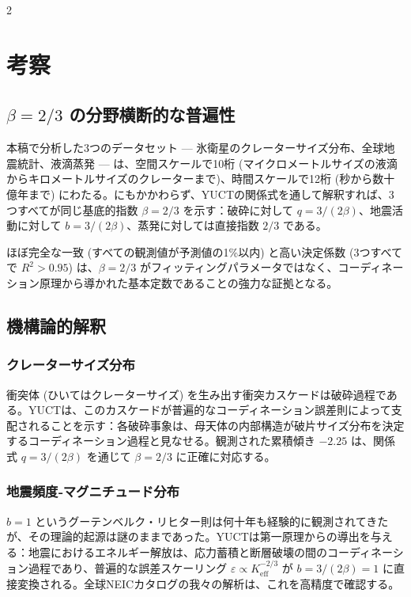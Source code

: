 \documentclass[11pt,a4paper]{article}
\newcommand{\eps}{\varepsilon}
\newcommand{\Keff}{K_{\mathrm{eff}}}
\newcommand{\betaf}{\beta}
\begin{document}
\begin{multicols}{2}
		\section{考察}
		
		\subsection{\(\betaf = 2/3\) の分野横断的な普遍性}
		
		本稿で分析した3つのデータセット — 氷衛星のクレーターサイズ分布、全球地震統計、液滴蒸発 — は、空間スケールで10桁 (マイクロメートルサイズの液滴からキロメートルサイズのクレーターまで)、時間スケールで12桁 (秒から数十億年まで) にわたる。にもかかわらず、YUCTの関係式を通して解釈すれば、3つすべてが同じ基底的指数 \(\betaf = 2/3\) を示す：破砕に対して \(q = 3/(2\betaf)\)、地震活動に対して \(b = 3/(2\betaf)\)、蒸発に対しては直接指数 \(2/3\) である。
		
		ほぼ完全な一致 (すべての観測値が予測値の1\%以内) と高い決定係数 (3つすべてで \(R^2 > 0.95\)) は、\(\betaf = 2/3\) がフィッティングパラメータではなく、コーディネーション原理から導かれた基本定数であることの強力な証拠となる。
		
		\subsection{機構論的解釈}
		
		\subsubsection{クレーターサイズ分布}
		衝突体 (ひいてはクレーターサイズ) を生み出す衝突カスケードは破砕過程である。YUCTは、このカスケードが普遍的なコーディネーション誤差則によって支配されることを示す：各破砕事象は、母天体の内部構造が破片サイズ分布を決定するコーディネーション過程と見なせる。観測された累積傾き \(-2.25\) は、関係式 \(q = 3/(2\betaf)\) を通じて \(\betaf = 2/3\) に正確に対応する。
		
		\subsubsection{地震頻度‐マグニチュード分布}
		\(b = 1\) というグーテンベルク・リヒター則は何十年も経験的に観測されてきたが、その理論的起源は謎のままであった。YUCTは第一原理からの導出を与える：地震におけるエネルギー解放は、応力蓄積と断層破壊の間のコーディネーション過程であり、普遍的な誤差スケーリング \(\eps \propto \Keff^{-2/3}\) が \(b = 3/(2\betaf) = 1\) に直接変換される。全球NEICカタログの我々の解析は、これを高精度で確認する。
		

\end{multicols}
\end{document}
